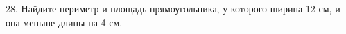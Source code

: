 28. Найдите периметр и площадь прямоугольника, у которого ширина 12 см, и она меньше длины на 4 см.\\
